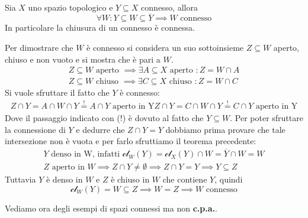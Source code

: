 \begin{theorema}~{}\\ \label{chiusuraconnessa}
	Sia $X$ uno spazio topologico e $Y\subseteq X$ connesso, allora
		\begin{equation*}
			\forall W \colon Y\subseteq W \subseteq \overline{Y} \implies W \text{ connesso}
		\end{equation*}
	In particolare la chiusura di un connesso è connessa.
\end{theorema}
\begin{demonstration}
	Per dimostrare che $W$ è connesso si considera un suo sottoinsieme $Z\subseteq W$ aperto, chiuso e non vuoto e si mostra che è pari a $W$.
		\begin{gather*}
			Z\subseteq W \text{ aperto } \implies \exists A\subseteq X \text{ aperto } \colon Z=W\cap A \\
			Z\subseteq W \text{ chiuso } \implies \exists C\subseteq X \text{ chiuso } \colon Z=W\cap C
		\end{gather*}
	Si vuole sfruttare il fatto che $Y$ è connesso:
		\begin{gather*}
			Z\cap Y=A\cap W\cap Y \stackrel{!}{=} A\cap Y \text{ aperto in Y}
			Z\cap Y=C\cap W\cap Y \stackrel{!}{=} C\cap Y \text{ aperto in Y}			
		\end{gather*}
	Dove il passaggio indicato con (!) è dovuto al fatto che $Y\subseteq W$. Per poter sfruttare la connessione di $Y$ e dedurre che $Z\cap Y=Y$ dobbiamo prima provare che tale intersezione non è vuota e per farlo sfruttiamo il teorema precedente:
		\begin{gather*}
			Y \text{ denso in W, infatti  } \mathcal{cl}_W(Y)=\mathcal{cl}_X(Y)\cap W=\overline{Y}\cap W=W\\
			Z \text{ aperto in } W \implies Z\cap Y \neq \emptyset \implies Z\cap Y=Y \implies Y\subseteq Z
		\end{gather*}
	Tuttavia $Y$ è denso in $W$ e $Z$ è chiuso in $W$ che contiene $Y$, quindi
		\begin{equation*}
			\mathcal{cl}_W(Y)=W\subseteq Z \implies W=Z \implies W \text{ connesso}
		\end{equation*}
\end{demonstration}
Vediamo ora degli esempi di spazi connessi ma non \textbf{c.p.a.}.
